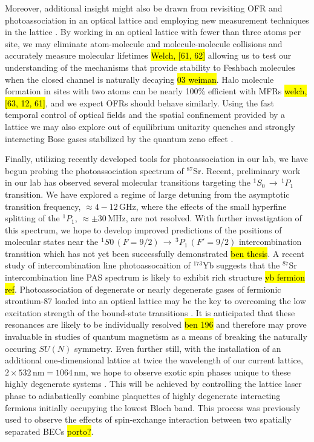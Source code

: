 Moreover, additional insight might also be drawn from revisiting OFR and photoassociation in an optical lattice and employing new measurement techniques in the lattice \hl{\cite{Taie2016}}. 
By working in an optical lattice with fewer than three atoms per site, we may eliminate atom-molecule and molecule-molecule collisions and accurately measure molecular lifetimes \hl{Welch, [61, 62]} allowing us to test our understanding of the mechanisms that provide stability to Feshbach molecules when the closed channel is naturally decaying \hl{03 weiman}. 
Halo molecule formation in sites with two atoms can be nearly 100\% efficient with MFRs \hl{welch, [63, 12, 61]}, and we expect OFRs should behave similarly.
Using the fast temporal control of optical fields and the spatial confinement provided by a lattice we may also explore out of equilibrium unitarity quenches \hl{\cite{Makotyn2014}} and strongly interacting Bose gases stabilized by the quantum zeno effect \hl{\cite{Fischer2001,Zhu2014,Daley2009,Syassen2008}}.

Finally, utilizing recently developed tools for photoassociation in our lab, we have begun probing the photoassociation spectrum of $^{87}$Sr.
Recent, preliminary work in our lab has observed several molecular transitions targeting the $^1S_0\,\rightarrow\,^1P_1$ transition.
We have explored a regime of large detuning from the asymptotic transition frequency, $\approx 4-12\,$GHz, where the effects of the small hyperfine splitting of the $^1P_1$, $\approx \pm30\,$MHz, are not resolved.
With further investigation of this spectrum, we hope to develop improved predictions of the positions of molecular states near the $^1S0\,(F=9/2)\,\rightarrow\,^3P_1\,(F'=9/2)$ intercombination transition which has not yet been successfully demonstrated \hl{ben thesis}.
A recent study of intercombination line photoassocaition of $^{173}$Yb suggests that the $^{87}$Sr intercombination line PAS spectrum is likely to exhibit rich structure \hl{yb fermion ref}.
Photoassociation of degenerate or nearly degenerate gases of fermionic strontium-87 loaded into an optical lattice may be the key to overcoming the low excitation strength of the bound-state transitions \hl{\cite{bhm12,tys12}}.
It is anticipated that these resonances are likely to be individually resolved \hl{ben 196} and therefore may prove invaluable in studies of quantum magnetism as a means of breaking the naturally occuring $SU(N)$ symmetry.
Even further still, with the installation of an additional one-dimensional lattice at twice the wavelength of our current lattice, $2\times 532\,\text{nm} = 1064\,$nm, we hope to observe exotic spin phases unique to these highly degenerate systems \hl{\cite{Beverland2016,cre14,Chen2015}}.
This will be achieved by controlling the lattice laser phase to adiabatically combine plaquettes of highly degenerate interacting fermions initially occupying the lowest Bloch band.
This process was previously used to observe the effects of spin-exchange interaction between two spatially separated BECs \hl{porto?}.

